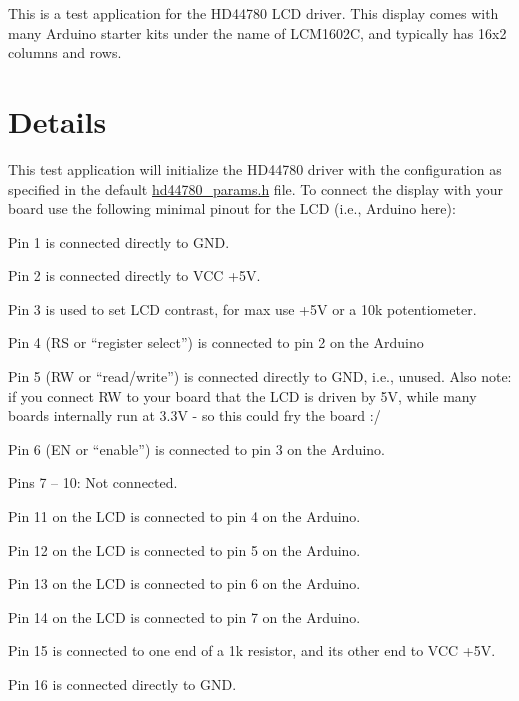 This is a test application for the H\+D44780 L\+CD driver. This display comes with many Arduino starter kits under the name of L\+C\+M1602C, and typically has 16x2 columns and rows.

\section*{Details}

This test application will initialize the H\+D44780 driver with the configuration as specified in the default {\ttfamily \hyperlink{hd44780__params_8h}{hd44780\+\_\+params.\+h}} file. To connect the display with your board use the following minimal pinout for the L\+CD (i.\+e., Arduino here)\+:


\begin{DoxyItemize}
\item Pin 1 is connected directly to G\+ND.
\item Pin 2 is connected directly to V\+CC +5V.
\item Pin 3 is used to set L\+CD contrast, for max use +5V or a 10k potentiometer.
\item Pin 4 (RS or “register select”) is connected to pin 2 on the Arduino
\item Pin 5 (RW or “read/write”) is connected directly to G\+ND, i.\+e., unused. Also note\+: if you connect RW to your board that the L\+CD is driven by 5V, while many boards internally run at 3.\+3V -\/ so this could fry the board \+:/
\item Pin 6 (EN or “enable”) is connected to pin 3 on the Arduino.
\item Pins 7 – 10\+: Not connected.
\item Pin 11 on the L\+CD is connected to pin 4 on the Arduino.
\item Pin 12 on the L\+CD is connected to pin 5 on the Arduino.
\item Pin 13 on the L\+CD is connected to pin 6 on the Arduino.
\item Pin 14 on the L\+CD is connected to pin 7 on the Arduino.
\item Pin 15 is connected to one end of a 1k resistor, and its other end to V\+CC +5V.
\item Pin 16 is connected directly to G\+ND. 
\end{DoxyItemize}